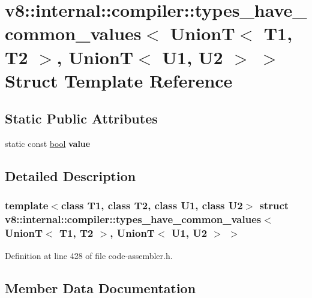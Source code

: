 \hypertarget{structv8_1_1internal_1_1compiler_1_1types__have__common__values_3_01UnionT_3_01T1_00_01T2_01_4_04ef2a62b06dbfc9926fe89ff9b6268d6}{}\section{v8\+:\+:internal\+:\+:compiler\+:\+:types\+\_\+have\+\_\+common\+\_\+values$<$ UnionT$<$ T1, T2 $>$, UnionT$<$ U1, U2 $>$ $>$ Struct Template Reference}
\label{structv8_1_1internal_1_1compiler_1_1types__have__common__values_3_01UnionT_3_01T1_00_01T2_01_4_04ef2a62b06dbfc9926fe89ff9b6268d6}
\subsection*{Static Public Attributes}
\begin{DoxyCompactItemize}
\item 
static const \mbox{\hyperlink{classbool}{bool}} {\bfseries value}
\end{DoxyCompactItemize}


\subsection{Detailed Description}
\subsubsection*{template$<$class T1, class T2, class U1, class U2$>$\newline
struct v8\+::internal\+::compiler\+::types\+\_\+have\+\_\+common\+\_\+values$<$ Union\+T$<$ T1, T2 $>$, Union\+T$<$ U1, U2 $>$ $>$}



Definition at line 428 of file code-\/assembler.\+h.



\subsection{Member Data Documentation}
\mbox{\label{structv8_1_1internal_1_1compiler_1_1types__have__common__values_3_01UnionT_3_01T1_00_01T2_01_4_04ef2a62b06dbfc9926fe89ff9b6268d6_a0f76430f92f392aaedf7fef73bee885d}} 
